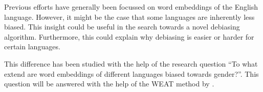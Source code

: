 Previous efforts have generally been focussed on word embeddings of the English language.
However, it might be the
case that some languages are inherently less biased.
This insight could be useful in the search towards a novel
debiasing algorithm. 
Furthermore, this could explain why debiasing is easier or harder for certain languages.

This difference has been studied with the help of the research
question ``To what extend are word
embeddings of different languages biased towards gender?''. 
This question will be answered with the help of the WEAT method by
\textcite{caliskan_2017_semantics_language_corpora}.
